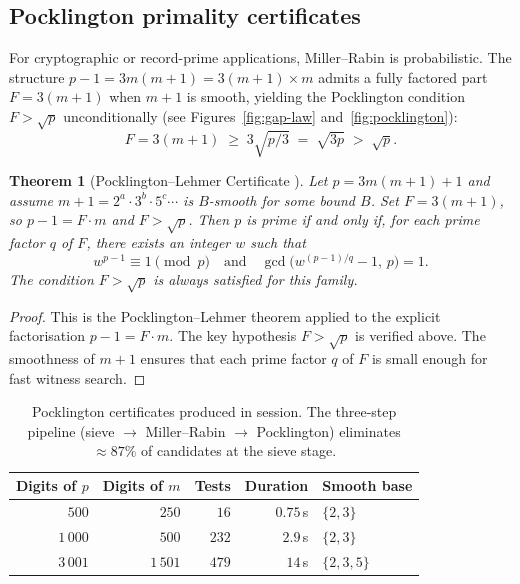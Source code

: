\documentclass[11pt,a4paper]{article}
\newtheorem{theorem}{Theorem}[section]
\theoremstyle{definition}
\theoremstyle{remark}
\begin{document}
\subsection{Pocklington primality certificates}

For cryptographic or record-prime applications, Miller--Rabin is
probabilistic. The structure $p-1=3m(m+1)=3(m+1)\times m$ admits a
fully factored part $F=3(m+1)$ when $m+1$ is smooth, yielding the
Pocklington condition $F>\sqrt{p}$ unconditionally
(see Figures~\ref{fig:gap-law} and~\ref{fig:pocklington}):
\[
  F=3(m+1)\;\ge\;3\sqrt{p/3}\;=\;\sqrt{3p}\;>\;\sqrt{p}.
\]

\begin{rigorousbox}
\begin{theorem}[Pocklington--Lehmer Certificate
\cite{Pocklington1914,LehmerPSW1975}]\label{thm:Pocklington}
Let $p=3m(m+1)+1$ and assume $m+1=2^{a}\cdot 3^{b}\cdot 5^{c}\cdots$
is $B$-smooth for some bound $B$. Set $F=3(m+1)$, so $p-1=F\cdot m$
and $F>\sqrt{p}$. Then $p$ is prime if and only if, for each prime
factor $q$ of $F$, there exists an integer $w$ such that
\[
  w^{p-1}\equiv 1\pmod{p}
  \quad\text{and}\quad
  \gcd\bigl(w^{(p-1)/q}-1,\,p\bigr)=1.
\]
The condition $F>\sqrt{p}$ is always satisfied for this family.
\end{theorem}
\end{rigorousbox}

\begin{proof}
This is the Pocklington--Lehmer theorem
\cite{Pocklington1914,LehmerPSW1975} applied to the explicit
factorisation $p-1=F\cdot m$. The key hypothesis $F>\sqrt{p}$ is
verified above. The smoothness of $m+1$ ensures that each prime
factor $q$ of $F$ is small enough for fast witness search.
\end{proof}

\begin{table}[ht]\centering
\caption{Pocklington certificates produced in session. The three-step
pipeline (sieve $\to$ Miller--Rabin $\to$ Pocklington) eliminates
$\approx 87\%$ of candidates at the sieve stage.}
\begin{tabular}{@{}rrrrl@{}}
\toprule
Digits of $p$ & Digits of $m$ & Tests & Duration & Smooth base \\
\midrule
$500$ & $250$ & $16$ & $0.75$\,s & $\{2,3\}$ \\
$1\,000$ & $500$ & $232$ & $2.9$\,s & $\{2,3\}$ \\
$3\,001$ & $1\,501$ & $479$ & $14$\,s & $\{2,3,5\}$ \\
\bottomrule
\end{tabular}
\end{table}
\end{document}
